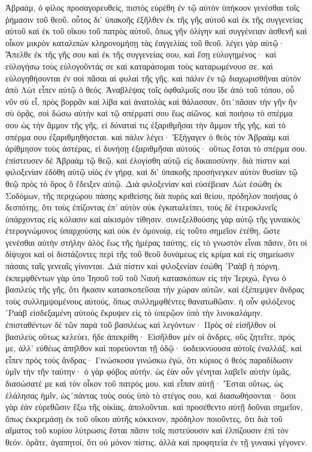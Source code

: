 Ἀβραάμ, ὁ φίλος προσαγορευθείς, πιστὸς εὑρέθη ἐν τῷ αὐτὸν ὑπήκοον γενέσθαι τοῖς ῥήμασιν τοῦ θεοῦ. οὗτος δι’ ὑπακοῆς ἐξῆλθεν ἐκ τῆς γῆς αὐτοῦ καὶ ἐκ τῆς συγγενείας αὐτοῦ καὶ ἐκ τοῦ οἴκου τοῦ πατρὸς αὐτοῦ, ὅπως γῆν ὀλίγην καὶ συγγένειαν ἀσθενῆ καὶ οἶκον μικρὸν καταλιπὼν κληρονομήσῃ τὰς ἐαγγελίας τοῦ θεοῦ. λέγει γὰρ αὐτῷ· Ἄπελθε ἐκ τῆς γῆς σου καὶ ἐκ τῆς συγγενείας σου, καὶ ἔσῃ εὐλογημένος· καὶ εὐλογήσω τοὺς εὐλογοῦντάς σε καὶ καταράσομαι τοὺς καταρωμένουσ σε. καὶ εὐλογηθήσονται ἐν σοὶ πᾶσαι αἱ φυλαὶ τῆς γῆς. καὶ πάλιν ἐν τῷ διαχωρισθῆναι αὐτὸν ἀπὸ Λὼτ εἶπεν αὐτῷ ὁ θεός. Ἀναβλέψας τοῖς ὀφθαλμοῖς σου ἴδε ἀπὸ τοῦ τόπου, οὗ νῦν σὺ εἶ, πρὸς βορρᾶν καὶ λίβα καὶ ἀνατολὰς καὶ θάλασσαν, ὅτι´πᾶσαν τὴν γῆν ἣν σὺ ὁρᾷς, σοὶ δώσω αὐτὴν καὶ τῷ σπέρματί σου ἕως αἰῶνος. καὶ ποιήσω τὸ σπέρμα σου ὡς τὴν ἄμμον τῆς γῆς, εἰ δύναταί τις ἐξαριθμῆσαι τὴν ἄμμον τῆς γῆς, καὶ τὸ σπέρμα σου ἐξαριθμηθήσεται. καὶ πάλιν λέγει· Ἐξήγαγεν ὁ θεὸς τὸν Ἀβραὰμ καὶ ἀρίθμησον τοὺς ἀστέρας, εἰ δυνήσῃ ἐξαριθμῆσαι αὐτούς· οὕτως ἔσται τὸ σπέρμα σου. ἐπίστευσεν δὲ Ἀβραὰμ τῷ θεῷ, καὶ ἐλογίσθη αὐτῷ εἰς δικαιοσύνην. διὰ πίστιν καὶ φιλοξενίαν ἐδόθη αὐτῷ υἱὸς ἐν γήρᾳ, καὶ δι’ ὑπακοῆς προσήνεγκεν αὐτὸν θυσίαν τῷ θεῷ πρὸς τὸ ὄρος ὃ ἔδειξεν αὐτῷ.
Διὰ φιλοξενίαν καὶ εὐσέβειαν Λὼτ ἐσώθη ἐκ Σοδόμων, τῆς περιχώρου πάσης κριθείσης διὰ πυρὸς καὶ θείου, πρόδηλον ποιήσας ὁ δεσπότης, ὅτι τοὺς ἐπίζοντας ἐπ’ αὐτὸν οὐκ ἐγκαταλείπει, τοὺς δὲ ἑτεροκλινεῖς ὑπάρχοντας εἰς κόλασιν καὶ αἰκισμὸν τίθησιν. συνεξελθούσης γὰρ αὐτῷ τῆς γυναικὸς ἑτερογνώμονος ὑπαρχούσης καὶ οὐκ ἐν ὁμονοίᾳ, εἰς τοῦτο σημεῖον ἐτέθη, ὥστε γενέσθαι αὐτὴν στήλην ἁλὸς ἕως τῆς ἡμέρας ταύτης, εἰς τὸ γνωστὸν εἶναι πᾶσιν, ὅτι οἱ δίψυχοι καὶ οἱ διστάζοντες περὶ τῆς τοῦ θεοῦ δυνάμεως εἰς κρίμα καὶ εἰς σημείωσιν πάσαις ταῖς γενεαῖς γίνονται.
Διὰ πίστιν καὶ φιλοξενίαν ἐσώθη ῾Ραὰβ ἡ πόρνη. ἐκπεμφθέντων γὰρ ὑπο Ἰησοῦ τοῦ τοῦ Ναυὴ κατασκόπων εἰς τὴν Ἱεριχώ, ἔγνω ὁ βασιλεὺς τῆς γῆς, ὅτι ἥκασιν κατασκοπεῦσαι τὴν χώραν αὐτῶν, καὶ ἐξέπεμψεν ἄνδρας τοὺς συλλημψομένους αὐτούς, ὅπως συλλημφθέντες θανατωθῶσιν. ἡ οὖν φιλόξενος ῾Ραὰβ εἰσδεξαμένη αὐτοὺς ἔκρυψεν εἰς τὸ ὑπερῷον ὑπὸ τὴν λινοκαλάμην. ἐπισταθέντων δὲ τῶν παρὰ τοῦ βασιλέως καὶ λεγόντων· Πρὸς σὲ εἰσῆλθον οἱ βασιλεὺς οὕτως κελεύει, ἥδε ἀπεκρίθη· Εἰσῆλθον μὲν οἱ ἄνδρες, οὓς ζητεῖτε, πρός με, ἀλλ’ εὐθέως ἀπη̈λθον καὶ πορεύονται τῇ ὁδῷ· ὐοδεικνύουσα αὐτοῖς ἐναλλάξ. καὶ εἶπεν πρὸς τοὺς ἄνδρας· Γινώσκοσα γινώσκω ἐγώ, ὅτι κύριος ὁ θεὸς παραδίδωσιν ὑμῖν τὴν τῆν ταύτην· ὁ γὰρ φόβος αὐτήν. ὡς ἐὰν οὖν γένηται λαβεῖν αὐτὴν ὑμᾶς, διασώσατέ με καὶ τὸν οἶκον τοῦ πατρός μου. καὶ εἶπαν αὐτῇ· Ἔσται οὕτως, ὡς ἐλάλησας ἡμῖν, ὡς´πάντας τοὺς σοὺς ὑπὸ τὸ στέγος σου, καὶ διασωθήσονται· ὅσοι γὰρ ἐὰν εὑρεθῶσιν ἔξω τῆς οἰκίας, ἀπολοῦνται. καὶ προσέθεντο αὐτῇ δοῦναι σημεῖον, ὅπως ἐκκρεμάσῃ ἐκ τοῦ οἴκου αὐτῆς κόκκινον, πρόδηλον ποιοῦντες, ὅτι διὰ τοῦ αἵματος τοῦ κυρίου λύτρωσις ἔσται πᾶσιν τοῖς πιστεύουσιν καὶ ἐλπίζουσιν ἐπὶ τὸν θεόν. ὁρᾶτε, ἀγαπητοί, ὅτι οὐ μόνον πίστις, ἀλλὰ καὶ προφητεία ἐν τῇ γυναικὶ γέγονεν.
